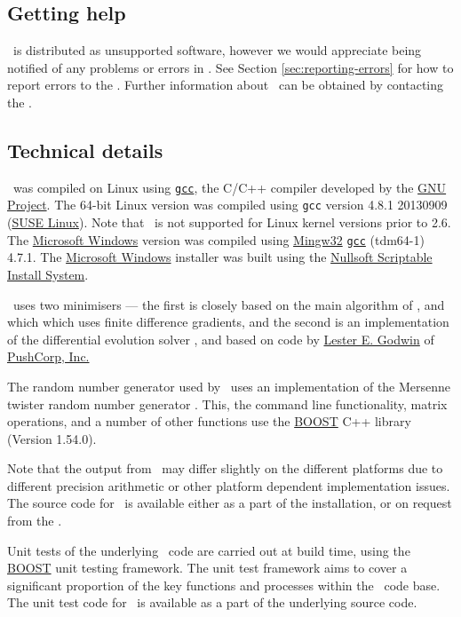 \subsection{Getting help}

\SPM\ is distributed as unsupported software, however we would appreciate being notified of any problems or errors in \SPM. See Section \ref{sec:reporting-errors} for how to report errors to the \authors. Further information about \SPM\ can be obtained by contacting the \authors.

\subsection{Technical details}

\SPM\ was compiled on Linux using \href{http://gcc.gnu.org}{\texttt{gcc}}, the C/C++ compiler developed by the \href{http://gcc.gnu.org}{GNU Project}. The 64-bit Linux  version was compiled using \texttt{gcc} version 4.8.1 20130909 (\href{http://www.opensuse.org/}{SUSE Linux}). Note that \SPM\ is not supported for Linux kernel versions prior to 2.6. The \href{http://www.microsoft.com}{Microsoft Windows} version was compiled using \href{http://www.mingw.org}{Mingw32} \href{http://gcc.gnu.org}{\texttt{gcc}} (tdm64-1) 4.7.1. The \href{http://www.microsoft.com}{Microsoft Windows} installer was built using the \href{http://nsis.sourceforge.net/Main_Page}{Nullsoft Scriptable Install System}.

\SPM\ uses two minimisers --- the first is closely based on the main algorithm of \cite{779}, and which which uses finite difference gradients, and the second is an implementation of the differential evolution solver \citep{1442}, and based on code by \href{mailto:<godwin@pushcorp.com>}{Lester E. Godwin} of \href{http://www.pushcorp.com}{PushCorp, Inc.} 

The random number generator used by \SPM\ uses an implementation of the Mersenne twister random number generator \citep{796}. This, the command line functionality, matrix operations, and a number of other functions use the \href{http://www.boost.org/}{BOOST} C++ library (Version 1.54.0).

Note that the output from \SPM\ may differ slightly on the different platforms due to different precision arithmetic or other platform dependent implementation issues. The source code for \SPM\ is available either as a part of the installation, or on request from the \authors.

Unit tests of the underlying \SPM\ code are carried out at build time, using the \href{http://www.boost.org/}{BOOST} unit testing framework. The unit test framework aims to cover a significant proportion of the key functions and processes within the \SPM\ code base. The unit test code for \SPM\ is available as a part of the underlying source code.

